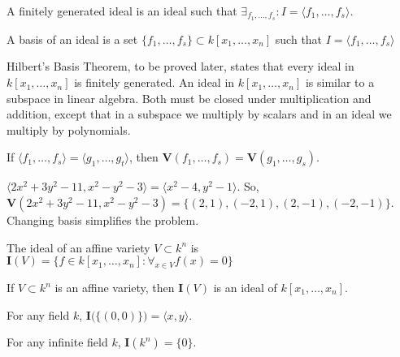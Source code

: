 \documentclass[crop=false,class=article,oneside]{standalone}
\begin{document}
            \begin{definition}
                A finitely generated ideal is an ideal
                such that
                $\exists_{f_1,\hdots, f_s}:I=\langle f_1,\hdots, f_s\rangle$.
            \end{definition}
            \begin{definition}
                A basis of an ideal is a set
                $\{f_1,\hdots, f_s\}\subset k[x_1,\hdots ,x_n]$
                such that $I=\langle f_{1},\hdots,f_{s}\rangle$
            \end{definition}
            Hilbert's Basis Theorem, to be proved later, states
            that every ideal in $k[x_{1},\hdots,x_{n}]$ is finitely
            generated. An ideal in $k[x_{1},\hdots,x_{n}]$ is similar
            to a subspace in linear algebra. Both must be closed
            under multiplication and addition, except that in a
            subspace we multiply by scalars and in an ideal
            we multiply by polynomials. 
            \begin{theorem}
                If $\langle f_1,\hdots,f_s\rangle=\langle g_1,\hdots,g_t\rangle$,
                then $\mathbf{V}(f_1,\hdots, f_s)=\mathbf{V}(g_1,\hdots, g_s)$.
            \end{theorem}
            \begin{example}
                $\langle2x^2+3y^2-11,x^2-y^2-3\rangle%
                 =\langle x^2-4,y^2-1\rangle$.
                So,
                $\mathbf{V}(2x^2+3y^2-11,x^2-y^2-3)%
                 =\{(2,1),(-2,1),(2,-1),(-2,-1)\}$.
                Changing basis simplifies the problem.
            \end{example}
            \begin{definition}
                The ideal of an affine variety
                $V\subset k^n$ is
                $\mathbf{I}(V)%
                 =\{f\in k[x_1,\hdots ,x_n]:\forall_{x\in V}f(x)=0\}$
            \end{definition}
            \begin{theorem}
                If $V\subset k^n$ is an affine variety,
                then $\mathbf{I}(V)$ is an ideal of
                $k[x_1,\hdots ,x_n]$.
            \end{theorem}
            \begin{theorem}
                For any field $k$,
                $\mathbf{I}\big(\{(0,0)\}\big)=\langle x,y\rangle$.
            \end{theorem}
            \begin{theorem}
                For any infinite field $k$,
                $\mathbf{I}(k^n)=\{0\}$.
            \end{theorem}
\end{document}
